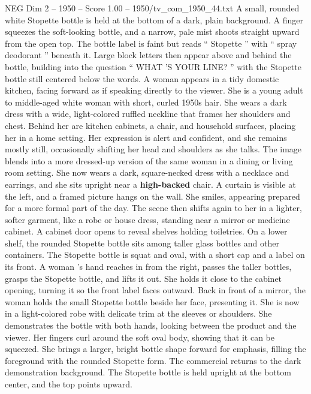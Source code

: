 \begin{textsample}{NEG Dim 2 – 1950 – Score 1.00 – 1950/tv\_com\_1950\_44.txt}  \label{ex:f2_neg_010}
A small, rounded white Stopette bottle is held at the bottom of a dark, plain background.
A finger squeezes the soft-looking bottle, and a narrow, pale mist shoots straight upward from the open top.
The bottle label is faint but reads “ Stopette ” with “ spray deodorant ” beneath it.
Large block letters then appear above and behind the bottle, building into the question “ WHAT ’S YOUR LINE? ” with the Stopette bottle still centered below the words.
A woman appears in a tidy domestic kitchen, facing forward as if speaking directly to the viewer.
She is a young adult to middle-aged white woman with short, curled 1950s hair.
She wears a dark dress with a wide, light-colored ruffled neckline that frames her shoulders and chest.
Behind her are kitchen cabinets, a chair, and household surfaces, placing her in a home setting.
Her expression is alert and confident, and she remains mostly still, occasionally shifting her head and shoulders as she talks.
The image blends into a more dressed-up version of the same woman in a dining or living room setting.
She now wears a dark, square-necked dress with a necklace and earrings, and she sits upright near a \textbf{high-backed} chair.
A curtain is visible at the left, and a framed picture hangs on the wall.
She smiles, appearing prepared for a more formal part of the day.
The scene then shifts again to her in a lighter, softer garment, like a robe or house dress, standing near a mirror or medicine cabinet.
A cabinet door opens to reveal shelves holding toiletries.
On a lower shelf, the rounded Stopette bottle sits among taller glass bottles and other containers.
The Stopette bottle is squat and oval, with a short cap and a label on its front.
A woman ’s hand reaches in from the right, passes the taller bottles, grasps the Stopette bottle, and lifts it out.
She holds it close to the cabinet opening, turning it so the front label faces outward.
Back in front of a mirror, the woman holds the small Stopette bottle beside her face, presenting it.
She is now in a light-colored robe with delicate trim at the sleeves or shoulders.
She demonstrates the bottle with both hands, looking between the product and the viewer.
Her fingers curl around the soft oval body, showing that it can be squeezed.
She brings a larger, bright bottle shape forward for emphasis, filling the foreground with the rounded Stopette form.
The commercial returns to the dark demonstration background.
The Stopette bottle is held upright at the bottom center, and the top points upward.

\end{textsample}
